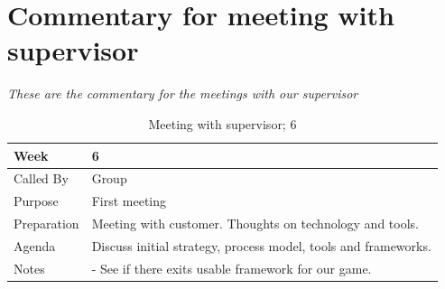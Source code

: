 
\chapter{Commentary for meeting with supervisor}
%
\emph{These are the commentary for the meetings with our supervisor}
%
%



{\footnotesize
\begin{table}[H]
\begin{tabular}{| p{5cm} | p{10cm} |}\hline
	\textbf{Week}	& \textbf{6} \\ \hline
	Called	By		& Group\\ \hline
	Purpose		& First meeting\\ \hline
	Preparation 
		& Meeting with customer. Thoughts on technology and tools.\\ 
		
	Agenda
		& Discuss initial strategy, process model, tools and frameworks. \\

	Notes	& - See if there exits usable framework for our game. \\ \hline
	
\end{tabular}


\caption{Meeting with supervisor; 6}
\label{fig:s_meeting_6}
\end{table}}


